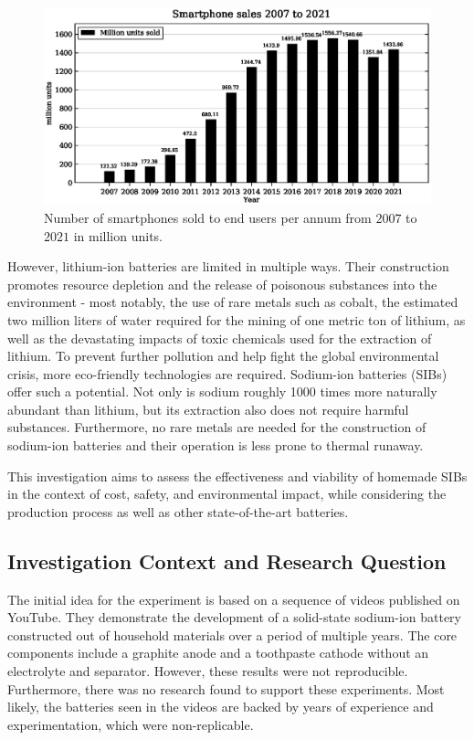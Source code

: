 \begin{figure}[ht]
    \centering
    \includegraphics[width=\textwidth]{images/phonesales.eps}
    \caption{Number of smartphones sold to end users per annum from $2007$ to $2021$ in million units.}
    \label{fig:smartphonesales}
\end{figure}

\newpage

However, lithium-ion batteries are limited in multiple ways. Their construction promotes resource depletion and the release of poisonous substances into the environment \cite{Mrozik2021} - most notably, the use of rare metals such as cobalt, the estimated two million liters of water required for the mining of one metric ton of lithium, as well as the devastating impacts of toxic chemicals used for the extraction of lithium\cite{Katwala2018,Peters2017}. To prevent further pollution and help fight the global environmental crisis, more eco-friendly technologies are required. Sodium-ion batteries (SIBs) offer such a potential. Not only is sodium roughly 1000 times more naturally abundant than lithium, but its extraction also does not require harmful substances\cite{WikipediaAbun2022}. Furthermore, no rare metals are needed for the construction of sodium-ion batteries and their operation is less prone to thermal runaway\cite{Peters2016}. 

This investigation aims to assess the effectiveness and viability of homemade SIBs in the context of cost, safety, and environmental impact, while considering the production process as well as other state-of-the-art batteries.

\subsection{Investigation Context and Research Question}
The initial idea for the experiment is based on a sequence of videos published on YouTube\cite{Youtube2019}. They demonstrate the development of a solid-state sodium-ion battery constructed out of household materials over a period of multiple years. The core components include a graphite anode and a toothpaste cathode without an electrolyte and separator. However, these results were not reproducible. Furthermore, there was no research found to support these experiments. Most likely, the batteries seen in the videos are backed by years of experience and experimentation, which were non-replicable.

